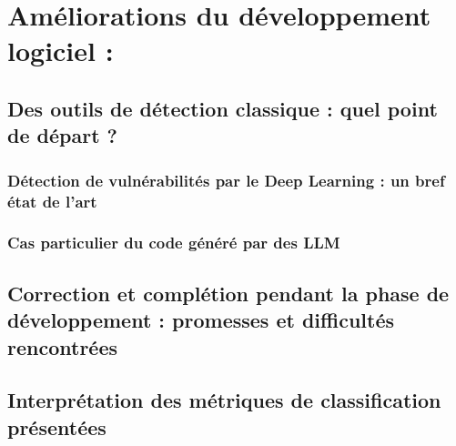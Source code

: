 \chapter{Améliorations du développement logiciel : }
    \section{Des outils de détection classique : quel point de départ ?}
        \subsection{}
            \subsubsection{}
        \subsection{Détection de vulnérabilités par le Deep Learning : un bref état de l'art}
    \subsection{Cas particulier du code généré par des LLM}
    \section{Correction et complétion pendant la phase de développement : promesses et difficultés rencontrées}
    \section{Interprétation des métriques de classification présentées}
